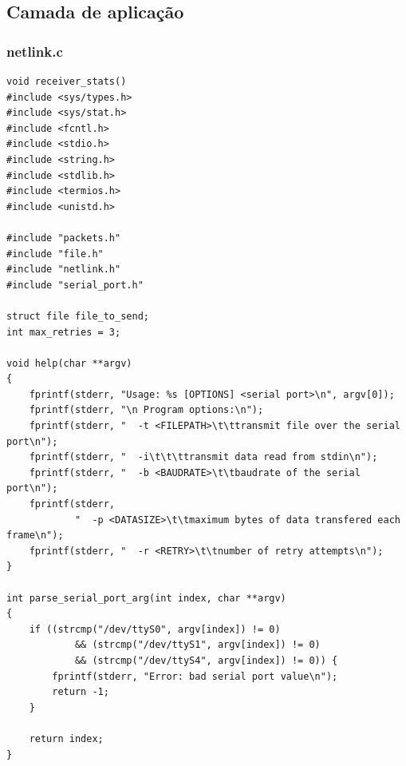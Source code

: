 \documentclass[a4paper,11pt,titlepage]{article}
\begin{document}
\subsection{Camada de aplicação}
\subsubsection*{netlink.c}
\begin{lstlisting}[style=customcwithlines]
void receiver_stats()
#include <sys/types.h>
#include <sys/stat.h>
#include <fcntl.h>
#include <stdio.h>
#include <string.h>
#include <stdlib.h>
#include <termios.h>
#include <unistd.h>

#include "packets.h"
#include "file.h"
#include "netlink.h"
#include "serial_port.h"

struct file file_to_send;
int max_retries = 3;

void help(char **argv)
{
	fprintf(stderr, "Usage: %s [OPTIONS] <serial port>\n", argv[0]);
	fprintf(stderr, "\n Program options:\n");
	fprintf(stderr, "  -t <FILEPATH>\t\ttransmit file over the serial port\n");
	fprintf(stderr, "  -i\t\t\ttransmit data read from stdin\n");
	fprintf(stderr, "  -b <BAUDRATE>\t\tbaudrate of the serial port\n");
	fprintf(stderr,
			"  -p <DATASIZE>\t\tmaximum bytes of data transfered each frame\n");
	fprintf(stderr, "  -r <RETRY>\t\tnumber of retry attempts\n");
}

int parse_serial_port_arg(int index, char **argv)
{
	if ((strcmp("/dev/ttyS0", argv[index]) != 0)
			&& (strcmp("/dev/ttyS1", argv[index]) != 0)
			&& (strcmp("/dev/ttyS4", argv[index]) != 0)) {
		fprintf(stderr, "Error: bad serial port value\n");
		return -1;
	}

	return index;
}


\end{lstlisting}
\end{document}

